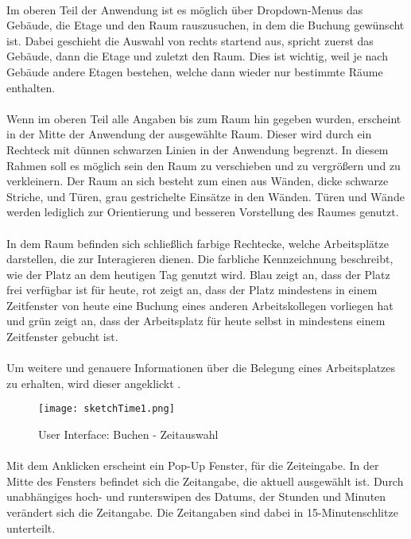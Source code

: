 \paragraph{}Im oberen Teil der Anwendung ist es möglich über Dropdown-Menus das Gebäude, die Etage und den Raum rauszusuchen, in dem die Buchung gewünscht ist.
Dabei geschieht die Auswahl von rechts startend aus, spricht zuerst das Gebäude, dann die Etage und zuletzt den Raum.
Dies ist wichtig, weil je nach Gebäude andere Etagen bestehen, welche dann wieder nur bestimmte Räume enthalten.

\paragraph{}Wenn im oberen Teil alle Angaben bis zum Raum hin gegeben wurden, erscheint in der Mitte der Anwendung der ausgewählte Raum.
Dieser wird durch ein Rechteck mit dünnen  schwarzen Linien in der Anwendung begrenzt.
In diesem Rahmen soll es möglich sein den Raum zu verschieben und zu vergrößern und zu verkleinern.
Der Raum an sich besteht zum einen aus Wänden, dicke schwarze Striche, und Türen, grau gestrichelte Einsätze in den Wänden. Türen und Wände werden 
lediglich zur Orientierung und besseren Vorstellung des Raumes genutzt. 
\paragraph{}In dem Raum befinden sich schließlich farbige Rechtecke, welche Arbeitsplätze darstellen, die zur Interagieren dienen. Die farbliche Kennzeichnung beschreibt, wie der Platz an dem heutigen Tag genutzt wird.
Blau zeigt an, dass der Platz frei verfügbar ist für heute, rot zeigt an, dass der Platz mindestens in einem Zeitfenster von heute eine Buchung eines anderen Arbeitskollegen vorliegen hat und grün zeigt an, dass der Arbeitsplatz für heute selbst in mindestens einem Zeitfenster gebucht ist.
\paragraph{}Um weitere und genauere Informationen über die Belegung eines Arbeitsplatzes zu erhalten, wird dieser angeklickt .

\begin{wrapfigure}[21]{l}{5.5cm}
  \texttt{[image: sketchTime1.png]}
  \caption{User Interface: Buchen - Zeitauswahl}
\end{wrapfigure}

\paragraph{}Mit dem Anklicken erscheint ein Pop-Up Fenster, für die Zeiteingabe. 
In der Mitte des Fensters befindet sich die Zeitangabe, die aktuell ausgewählt ist. 
Durch unabhängiges hoch- und runterswipen des Datums, der Stunden und Minuten verändert sich die Zeitangabe.
Die Zeitangaben sind dabei in 15-Minutenschlitze unterteilt.


